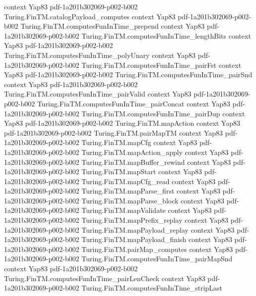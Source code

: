 \begin{theorem}
  {context}
  {Yap83}
  {pdf-1a201b302069-p002-b002}
\proofstep
  {Turing.FinTM.catalogPayload_computes}
  {context}
  {Yap83}
  {pdf-1a201b302069-p002-b002}
\proofstep
  {Turing.FinTM.computesFunInTime_prepend}
  {context}
  {Yap83}
  {pdf-1a201b302069-p002-b002}
\proofstep
  {Turing.FinTM.computesFunInTime_lengthBits}
  {context}
  {Yap83}
  {pdf-1a201b302069-p002-b002}
\proofstep
  {Turing.FinTM.computesFunInTime_polyUnary}
  {context}
  {Yap83}
  {pdf-1a201b302069-p002-b002}
\proofstep
  {Turing.FinTM.computesFunInTime_pairFst}
  {context}
  {Yap83}
  {pdf-1a201b302069-p002-b002}
\proofstep
  {Turing.FinTM.computesFunInTime_pairSnd}
  {context}
  {Yap83}
  {pdf-1a201b302069-p002-b002}
\proofstep
  {Turing.FinTM.computesFunInTime_pairValid}
  {context}
  {Yap83}
  {pdf-1a201b302069-p002-b002}
\proofstep
  {Turing.FinTM.computesFunInTime_pairConcat}
  {context}
  {Yap83}
  {pdf-1a201b302069-p002-b002}
\proofstep
  {Turing.FinTM.computesFunInTime_pairDup}
  {context}
  {Yap83}
  {pdf-1a201b302069-p002-b002}
\proofstep
  {Turing.FinTM.mapAction}
  {context}
  {Yap83}
  {pdf-1a201b302069-p002-b002}
\proofstep
  {Turing.FinTM.pairMapTM}
  {context}
  {Yap83}
  {pdf-1a201b302069-p002-b002}
\proofstep
  {Turing.FinTM.mapCfg}
  {context}
  {Yap83}
  {pdf-1a201b302069-p002-b002}
\proofstep
  {Turing.FinTM.mapAction_apply}
  {context}
  {Yap83}
  {pdf-1a201b302069-p002-b002}
\proofstep
  {Turing.FinTM.mapBuffer_rewind}
  {context}
  {Yap83}
  {pdf-1a201b302069-p002-b002}
\proofstep
  {Turing.FinTM.mapStart}
  {context}
  {Yap83}
  {pdf-1a201b302069-p002-b002}
\proofstep
  {Turing.FinTM.mapCfg_read}
  {context}
  {Yap83}
  {pdf-1a201b302069-p002-b002}
\proofstep
  {Turing.FinTM.mapParse_first}
  {context}
  {Yap83}
  {pdf-1a201b302069-p002-b002}
\proofstep
  {Turing.FinTM.mapParse_block}
  {context}
  {Yap83}
  {pdf-1a201b302069-p002-b002}
\proofstep
  {Turing.FinTM.mapValidate}
  {context}
  {Yap83}
  {pdf-1a201b302069-p002-b002}
\proofstep
  {Turing.FinTM.mapPrefix_replay}
  {context}
  {Yap83}
  {pdf-1a201b302069-p002-b002}
\proofstep
  {Turing.FinTM.mapPayload_replay}
  {context}
  {Yap83}
  {pdf-1a201b302069-p002-b002}
\proofstep
  {Turing.FinTM.mapPayload_finish}
  {context}
  {Yap83}
  {pdf-1a201b302069-p002-b002}
\proofstep
  {Turing.FinTM.pairMap_computes}
  {context}
  {Yap83}
  {pdf-1a201b302069-p002-b002}
\proofstep
  {Turing.FinTM.computesFunInTime_pairMapSnd}
  {context}
  {Yap83}
  {pdf-1a201b302069-p002-b002}
\proofstep
  {Turing.FinTM.computesFunInTime_pairLenCheck}
  {context}
  {Yap83}
  {pdf-1a201b302069-p002-b002}
\proofstep
  {Turing.FinTM.computesFunInTime_stripLast}

\end{theorem}
